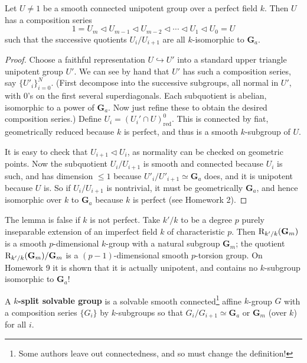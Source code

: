 \documentclass[10pt]{article}
\renewcommand{\(}{\left(}
\renewcommand{\)}{\right)}
\numberwithin{thm}{subsection}
\begin{document}
\begin{lem}\label{unipotentsolvable}
Let $U\neq 1$ be a smooth connected unipotent group over
a perfect field $k$.
Then $U$ has a composition series
\[1=U_m\vartriangleleft U_{m-1}\vartriangleleft U_{m-2}\vartriangleleft \cdots\vartriangleleft U_1\vartriangleleft U_0=U\]
such that the successive quotients $U_i/U_{i+1}$ are all
$k$-isomorphic to $\mathbf{G}_a$. 
\end{lem}
\begin{proof}
Choose a faithful representation $U\hookrightarrow U'$
into a standard upper triangle unipotent group $U'$.
We can see by hand that $U'$ has such a composition series, say $\{U'_i\}_{i=0}^N$.
(First decompose into the successive subgroups, all normal in $U'$,
with $0$'s on the first several superdiagonals. Each subquotient is
abelian, isomorphic to a power of $\mathbf{G}_a$. Now just refine
these to obtain the desired composition series.) 
Define $U_i=(U_i'\cap U)_\mathrm{red}^0$. This is connected
by fiat, geometrically reduced because $k$ is perfect,
and thus is a smooth $k$-subgroup of $U$.

It is easy to check that $U_{i+1}\vartriangleleft U_i$, as normality can be checked on geometric points.
Now the subquotient $U_i/U_{i+1}$ is smooth and connected because $U_i$ is such,
and has dimension $\leq 1$ because $U'_i/U'_{i+1}\simeq \mathbf{G}_a$ does,
and it is unipotent because $U$ is.
So if $U_i/U_{i+1}$ is nontrivial, it must be geometrically $\mathbf{G}_a$,
and hence isomorphic over $k$ to $\mathbf{G}_a$ because $k$ is perfect (see Homework 2).
\end{proof}
\begin{ex}
The lemma is false if $k$ is not perfect. Take $k'/k$ to be a degree $p$ purely inseparable extension of an imperfect field $k$ of characteristic $p$.
Then ${\rm{R}}_{k'/k}(\mathbf{G}_m)$ is a smooth $p$-dimensional $k$-group
with a natural subgroup $\mathbf{G}_m$;
the quotient ${\rm{R}}_{k'/k}(\mathbf{G}_m)/\mathbf{G}_m$
is a $(p-1)$-dimensional smooth $p$-torsion group.
On Homework 9 it is shown that it is actually unipotent,
and contains no $k$-subgroup isomorphic to $\mathbf{G}_a$!
\end{ex}

\begin{defn}\label{ksplitsolvable}
A \textbf{$k$-split solvable group} is a solvable 
smooth connected\footnote{Some authors leave out connectedness, and so must change the definition!}
affine $k$-group $G$ with a composition series $\{G_i\}$ by
$k$-subgroups so that $G_i/G_{i+1}\simeq \mathbf{G}_a$ or $\mathbf{G}_m$
(over $k$) for all $i$.
\end{defn}
\end{document}
